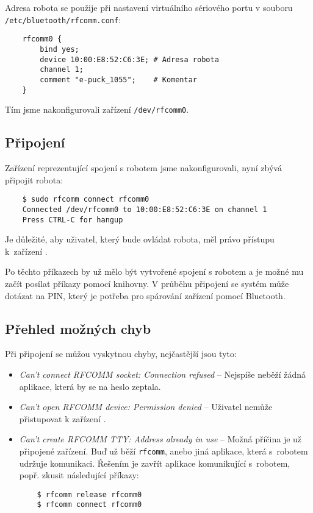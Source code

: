     Adresa robota se použije při nastavení virtuálního sériového portu v
    souboru {\tt /etc/bluetooth/rfcomm.conf}:

    \begin{verbatim}
    rfcomm0 {
        bind yes;
        device 10:00:E8:52:C6:3E; # Adresa robota
        channel 1;
        comment "e-puck_1055";    # Komentar
    }
    \end{verbatim}

    Tím jsme nakonfigurovali zařízení {\tt /dev/rfcomm0}.

    \subsection{Připojení}

    Zařízení reprezentující spojení s robotem jsme nakonfigurovali, nyní zbývá
    připojit robota:

    \begin{verbatim}
    $ sudo rfcomm connect rfcomm0
    Connected /dev/rfcomm0 to 10:00:E8:52:C6:3E on channel 1
    Press CTRL-C for hangup
    \end{verbatim}

    Je důležité, aby uživatel, který bude ovládat robota, měl právo přístupu
    k~zařízení .

    Po těchto příkazech by už mělo být vytvořené spojení s robotem a je možné
    mu začít posílat příkazy pomocí knihovny. V průběhu připojení se systém
    může dotázat na PIN, který je potřeba pro spárování zařízení pomocí
    Bluetooth.

    \subsection{Přehled možných chyb}
    Při připojení se můžou vyskytnou chyby, nejčastější jsou tyto:
    \begin{itemize}
    \item{{\em Can't connect RFCOMM socket: Connection refused} -- Nejspíše
        neběží žádná aplikace, která by se na heslo zeptala.}
    \item{{\em Can't open RFCOMM device: Permission denied} -- Uživatel nemůže
        přistupovat k zařízení .}
    \item{{\em Can't create RFCOMM TTY: Address already in use} -- Možná
        příčina je už připojené zařízení. Buď už běží {\tt rfcomm}, anebo jiná
        aplikace, která s~robotem udržuje komunikaci. Řešením je zavřít
        aplikace komunikující s~robotem, popř. zkusit následující příkazy:
    \begin{verbatim}
    $ rfcomm release rfcomm0
    $ rfcomm connect rfcomm0
    \end{verbatim}
    }
    \end{itemize}

